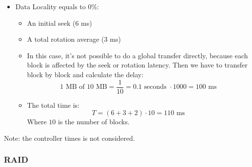 \begin{exercisebox}
\begin{itemize}
        \newpage
        \item Data Locality equals to 0\%:
        \begin{itemize}
            \item An initial seek ($6$ ms)
            \item A total rotation average ($3$ ms)
            \item In this case, it's not possible to do a global transfer directly, because each block is affected by the seek or rotation latency. Then we have to transfer block by block and calculate the delay:
            \begin{equation*}
                \text{1 MB of 10 MB} = \dfrac{1}{10} = 0.1 \text{ seconds } \cdot 1000 = 100 \text{ ms}
            \end{equation*}
            \item The total time is:
            \begin{equation*}
                T = \left(6 + 3 + 2\right) \cdot 10 = 110 \text{ ms}
            \end{equation*}
            Where $10$ is the number of blocks.
        \end{itemize}
    \end{itemize}
    Note: the controller times is not considered.
\end{exercisebox}

\newpage

\subsubsection{RAID}

